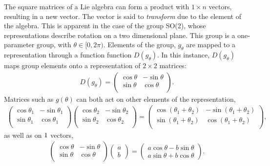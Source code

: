 The square \nxn matrices of a Lie algebra can form a product with $1\times n$ vectors, resulting in a new vector. 
The vector is said to \emph{transform} due to the element of the algebra.
This is apparent in the case of the group SO(2), whose representations describe rotation on a two dimensional plane.
This group is a one-parameter group, with $\theta\in[0,2\pi)$.
Elements of the group, $g_\theta$ are mapped to a representation through a function function $D(g_\theta)$.
In this instance, $D(g_\theta)$ maps group elements onto a representation of $2\times2$ matrices:
\begin{equation}\begin{split}\label{eqn:so2Rep}
    D(g_\theta) = \begin{pmatrix}
        \cos\theta &-\sin\theta \\
        \sin\theta & \cos\theta \\
    \end{pmatrix}.
\end{split}\end{equation} 
Matrices such as $g(\theta)$ can both act on other elements of the representation, 
\begin{equation}\begin{split}
    \begin{pmatrix}
        \cos\theta_1 &-\sin\theta_1 \\
        \sin\theta_1 & \cos\theta_1 \\
    \end{pmatrix}
    \begin{pmatrix}
        \cos\theta_2 &-\sin\theta_2 \\
        \sin\theta_2 & \cos\theta_2 \\
    \end{pmatrix}
    =
    \begin{pmatrix}
        \cos(\theta_1+\theta_2) &-\sin(\theta_1+\theta_2) \\
        \sin(\theta_1+\theta_2) & \cos(\theta_1+\theta_2) \\
    \end{pmatrix},
\end{split}\end{equation} 
as well as on $1\time2$ vectors,
\begin{equation}\begin{split}
    \begin{pmatrix}
        \cos\theta &-\sin\theta \\
        \sin\theta & \cos\theta \\
    \end{pmatrix}
    \begin{pmatrix}a\\b\end{pmatrix}
    =
    \begin{pmatrix}a\cos\theta-b\sin\theta\\a\sin\theta+b\cos\theta\end{pmatrix}.
\end{split}\end{equation} 
